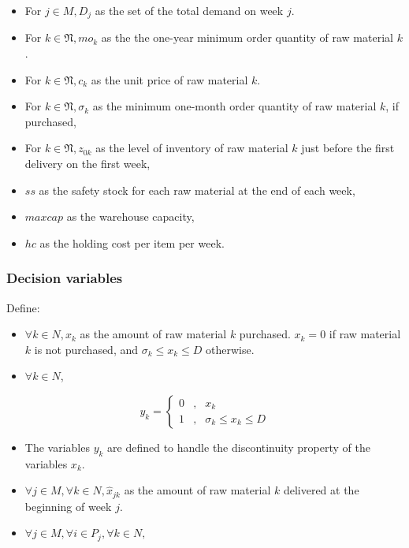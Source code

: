 \documentclass[preprint, 3p,
authoryear]{elsarticle} %
\providecommand{\tightlist}{%
  \setlength{\itemsep}{0pt}\setlength{\parskip}{0pt}}
\begin{document}
\begin{itemize}
\tightlist
\item
  For \(j \in M, D_j\) as the set of the total demand on week \(j\).
\item
  For \(k \in \mathfrak{N}, mo_k\) as the the one-year minimum order
  quantity of raw material \(k\).
\item
  For \(k \in \mathfrak{N}, c_k\) as the unit price of raw material
  \(k\).
\item
  For \(k \in \mathfrak{N}, \sigma_k\) as the minimum one-month order
  quantity of raw material \(k\), if purchased,
\item
  For \(k \in \mathfrak{N}, z_{0k}\) as the level of inventory of raw
  material \(k\) just before the first delivery on the first week,
\item
  \(ss\) as the safety stock for each raw material at the end of each
  week,
\item
  \(maxcap\) as the warehouse capacity,
\item
  \(hc\) as the holding cost per item per week.
\end{itemize}

\hypertarget{decision-variables}{%
\subsubsection{Decision variables}\label{decision-variables}}

Define:

\begin{itemize}
\tightlist
\item
  \(\forall k \in N, x_k\) as the amount of raw material \(k\)
  purchased. \(x_k = 0\) if raw material \(k\) is not purchased, and
  \(\sigma_k \leq x_k \leq D\) otherwise.
\item
  \(\forall k \in N\),
\end{itemize}

\[y_k = 
\left\{\begin{matrix}
0 & , & x_k  \\ 
1 & , & \sigma_k \leq x_k \leq D
\end{matrix}\right. 
\]

\begin{itemize}
\tightlist
\item
  The variables \(y_k\) are defined to handle the discontinuity property
  of the variables \(x_k\).
\item
  \(\forall j \in M, \forall k \in N, \hat{x}_{jk}\) as the amount of
  raw material \(k\) delivered at the beginning of week \(j\).
\item
  \(\forall j \in M, \forall i \in P_j, \forall k \in N,\)
\end{itemize}
\end{document}
